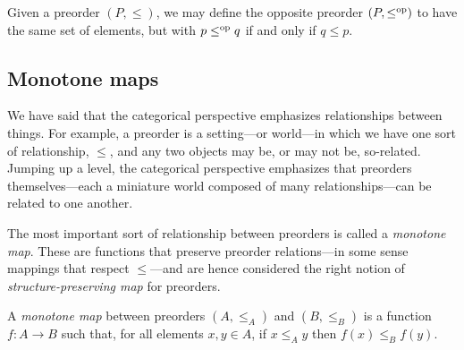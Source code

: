 \documentclass[7Sketches]{subfiles}
\begin{document}
\begin{example}%
\label{ex.opposite}%
  Given a preorder $(P,\le)$, we may define the opposite preorder $(P,\leq^{\textnormal{op}})$ to have the same set
  of elements, but with $p\leq^{\textnormal{op}} q$ if and only if $q \le p$.
\end{example}

%
\subsection{Monotone maps}%
%

We have said that the categorical perspective emphasizes relationships between
things. For example, a preorder is a setting---or world---in which we have one sort of
relationship, $\leq$, and any two objects may be, or may not be, so-related.
Jumping up a level, the categorical perspective emphasizes that preorders
themselves---each a miniature world composed of many relationships---can be related to one another.%

The most important sort of relationship between
preorders is called a \emph{monotone map}. These are functions that preserve preorder
relations---in some sense mappings that respect $\leq$---and are hence considered the right notion of \emph{structure-preserving map} for preorders.%

\begin{definition}%
%
%
A \emph{monotone map} between
preorders $(A,\leq_A)$ and $(B,\leq_B)$ is a function $f\colon A \to B$ such that, for all elements $x,y\in A$, if $x \leq_A
y$ then $f(x) \leq_B f(y)$.
\end{definition}
\end{document}

